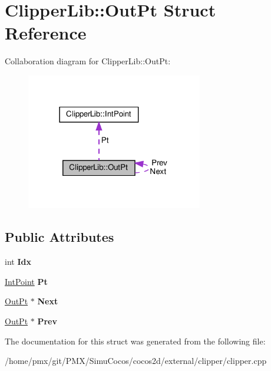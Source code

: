 \hypertarget{structClipperLib_1_1OutPt}{}\section{Clipper\+Lib\+:\+:Out\+Pt Struct Reference}
\label{structClipperLib_1_1OutPt}


Collaboration diagram for Clipper\+Lib\+:\+:Out\+Pt\+:
\nopagebreak
\begin{figure}[H]
\begin{center}
\leavevmode
\includegraphics[width=218pt]{structClipperLib_1_1OutPt__coll__graph}
\end{center}
\end{figure}
\subsection*{Public Attributes}
\begin{DoxyCompactItemize}
\item 
\mbox{\label{structClipperLib_1_1OutPt_ad04d3691d47a5d0d9b2ae097e7e7bf10}} 
int {\bfseries Idx}
\item 
\mbox{\label{structClipperLib_1_1OutPt_aa01c2b1e9c5b2d8faa40701178ffcf98}} 
\hyperlink{structClipperLib_1_1IntPoint}{Int\+Point} {\bfseries Pt}
\item 
\mbox{\label{structClipperLib_1_1OutPt_a372ee52ee550684bf11acd7d5bf3187a}} 
\hyperlink{structClipperLib_1_1OutPt}{Out\+Pt} $\ast$ {\bfseries Next}
\item 
\mbox{\label{structClipperLib_1_1OutPt_ab441df5d6d62bd6d8d53c47194ae04c2}} 
\hyperlink{structClipperLib_1_1OutPt}{Out\+Pt} $\ast$ {\bfseries Prev}
\end{DoxyCompactItemize}


The documentation for this struct was generated from the following file\+:\begin{DoxyCompactItemize}
\item 
/home/pmx/git/\+P\+M\+X/\+Simu\+Cocos/cocos2d/external/clipper/clipper.\+cpp\end{DoxyCompactItemize}
